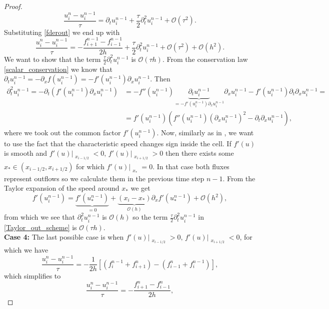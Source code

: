 \documentclass[../include.tex]{subfiles}
\begin{document}
\begin{proof}
\begin{equation}
	\frac{u_i^{n} -  u_i^{n-1}}{\tau} = \partial_t u_i^{n-1} + \frac{\tau}{2}\partial_t^2 u_i^{n-1} + \mathcal{O}(\tau^2).
\end{equation}
Substituting \eqref{fderout} we end up with
\begin{equation}
	\label{Taylor_out_scheme}
	\frac{u_i^{n} -  u_i^{n-1}}{\tau} = -\frac{f_{i+1}^{n-1} - f_{i-1}^{n-1}}{2h} + \frac{\tau}{2}\partial_t^2 u_i^{n-1} + \mathcal{O}(\tau^2) + \mathcal{O}(h^2).
\end{equation}
We want to show that the term $ \frac{\tau}{2}\partial_t^2 u_i^{n-1} $ is $ \mathcal{O}(\tau h) $. From the conservation law \eqref{scalar_conservation} we know that $ \partial_t u_i^{n-1} = -\partial_x f(u_i^{n-1}) = - f'(u_i^{n-1}) \partial_x u_i^{n-1} $. Then
\begin{align}
	\partial^2_t u_i^{n-1} = - \partial_t \left(f'(u_i^{n-1}) \partial_x u_i^{n-1}\right) &=
	- f''(u_i^{n-1}) \underbrace{\partial_t u_i^{n-1}}_{=- f'(u_i^{n-1}) \partial_x u_i^{n-1}} \partial_x u_i^{n-1} - f'(u_i^{n-1}) \partial_t \partial_x u_i^{n-1}=\nonumber\\
	&= f'(u_i^{n-1}) \left(f''(u_i^{n-1}) (\partial_x u_i^{n-1})^2 - \partial_t \partial_x u_i^{n-1}\right),
\end{align}
where we took out the common factor $ f'(u_i^{n-1}) $. Now, similarly as in \cite{iioe2012, iioe2}, we want to use the fact that the characteristic speed changes sign inside the cell. If $ f'(u) $ is smooth and $ f'(u)\big|_{\substack{x_{i-1/2}}} < 0,  \,f'(u)\big|_{\substack{x_{i+1/2}}} > 0 $ then there exists some $ x_* \in (x_{i-1/2}, x_{i+1/2}) $ for which $ f'(u)\big|_{\substack{x_{*}}} = 0 $. In that case both fluxes represent outflows so we calculate them in the previous time step $ n-1 $. From the Taylor expansion of the speed around $ x_* $ we get
\[
f'(u_i^{n-1}) = \underbrace{f'(u_*^{n-1})}_{=0} + \underbrace{(x_i - x_*)}_{\mathcal{O}(h)}\partial_x f'(u_*^{n-1}) + \mathcal{O}(h^2),
\]
from which we see that $ \partial_t^2 u_i^{n-1} $ is $ \mathcal{O}(h) $ so the term $ \frac{\tau}{2}\partial_t^2 u_i^{n-1} $ in \eqref{Taylor_out_scheme} is $ \mathcal{O}(\tau h) $.\\
\textbf{Case 4: }The last possible case is when $ f'(u)\big|_{\substack{x_{i-1/2}}} > 0,  \,f'(u)\big|_{\substack{x_{i+1/2}}} < 0 $, for which we have
\[
\frac{u_i^{n} - u_i^{n - 1}}{\tau} = - \frac{1}{2h}\left[(f_i^{n-1} + f_{i+1}^{n}) - (f_{i-1}^{n} + f_i^{n-1})\right],
\]
which simplifies to
\[
\frac{u_i^{n} - u_i^{n - 1}}{\tau} = - \frac{f_{i+1}^{n} - f_{i-1}^{n}}{2h},
\]
\end{proof}
\end{document}
